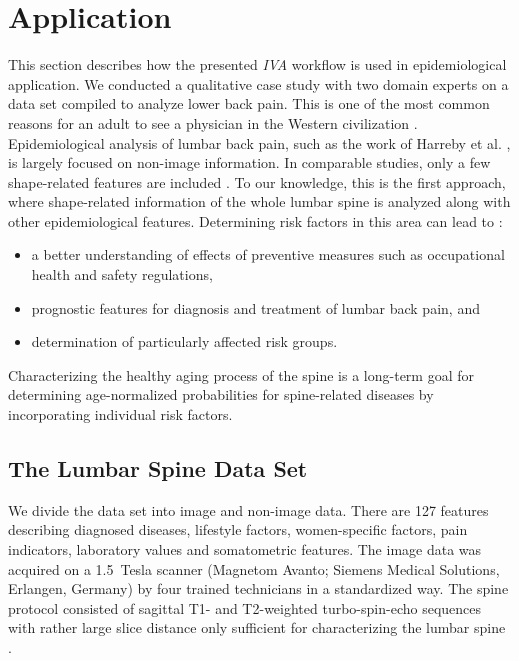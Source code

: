 \documentclass[journal]{style/vgtc} 			          %
\begin{document}
\section{Application}
This section describes how the presented \emph{IVA} workflow is used in epidemiological application.
%
We conducted a qualitative case study with two domain experts on a data set compiled to analyze lower back pain. 
%
This is one of the most common reasons for an adult to see a physician in the Western civilization \cite{Backpain}.
%
Epidemiological analysis of lumbar back pain, such as the work of Harreby et al. \cite{Harreby1996}, is largely focused on non-image information.
%
In comparable studies, only a few shape-related features are included \cite{Lang2011}.
%
To our knowledge, this is the first approach, where shape-related information of the whole lumbar spine is analyzed along with other epidemiological features.
%
Determining risk factors in this area can lead to \cite{Fletcher2012}:
\begin{itemize}
	\item a better understanding of effects of preventive measures such as occupational health and safety regulations,
	\item prognostic features for diagnosis and treatment of lumbar back pain, and
	\item determination of particularly affected risk groups.
\end{itemize}
%
Characterizing the healthy aging process of the spine is a long-term goal for determining age-normalized probabilities for spine-related diseases by incorporating individual risk factors.
%
\subsection{The Lumbar Spine Data Set}
We divide the data set into image and non-image data.
%
There are 127 features describing diagnosed diseases, lifestyle factors, women-specific factors, pain indicators, laboratory values and somatometric features.
%
The image data was acquired on a 1.5~Tesla scanner (Magnetom Avanto; Siemens Medical Solutions, Erlangen, Germany) by four trained technicians in a standardized way.
%
The spine protocol consisted of sagittal T1- and T2-weighted turbo-spin-echo sequences with rather large slice distance only sufficient for characterizing the lumbar spine \cite{Hegenscheid2013}.
\end{document}
